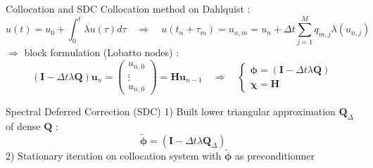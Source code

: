 \documentclass[11pt,aspectratio=43]{beamer}
\newcommand{\matr}[1]{\mathbf{#1}}
\newcommand{\vect}[1]{\boldsymbol{#1}}
\newcommand{\Imat}{\matr{I}}
\newcommand{\Qmat}{\matr{Q}}
\newcommand{\QDelta}{\matr{Q}_\Delta}
\newcommand{\Hmat}{\matr{H}}
\newcommand{\uvect}{\vect{u}}
\newcommand{\phiOp}{\bm{\phi}}
\newcommand{\chiOp}{\bm{\chi}}
\newcommand{\phiApprox}{\bm{\tilde{\phi}}}
\begin{document}
\begin{frame}{Collocation and SDC}\vskip3pt
	Collocation method on Dahlquist :\vspace{-10pt}
	$$
	u(t) = u_0 + \int_{0}^{t} \lambda u(\tau)d\tau  \quad
	\Rightarrow \quad
	u(t_n+\tau_m) = u_{n,m} = u_n + \Delta{t}\sum_{j=1}^{M} q_{m,j}\lambda(u_{n,j})
	$$\vspace{-5pt}
	$\Rightarrow$ block formulation (Lobatto nodes) :
	$$(\Imat-\Delta{t}\lambda\Qmat) \uvect_{n} = \begin{pmatrix}
		u_{n,0} \\ \vdots \\ u_{n,0}
	\end{pmatrix} = \Hmat \uvect_{n-1} \quad
	\Rightarrow \quad
	\begin{cases}
		\phiOp = (\Imat-\Delta{t}\lambda\Qmat)\\
		\chiOp = \Hmat
	\end{cases}
	$$\vspace{-10pt}
    \begin{block}{Spectral Deferred Correction (SDC)}
    	1) Built lower triangular approximation $\QDelta$ of dense $\Qmat$ :\vspace*{-3pt}
        $$\phiApprox = (\Imat-\Delta{t}\lambda\QDelta)$$\vskip-3pt
        2) Stationary iteration on collocation system with $\phiApprox$ as preconditionner
    \end{block}\vspace{-25pt}
\end{frame}
\end{document}
